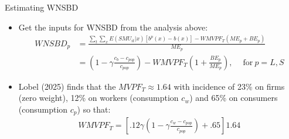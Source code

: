 \begin{frame}[label=payroll]{Estimating WNSBD}
    \begin{itemize}
        \item Get the inputs for WNSBD from the analysis above:
        {\footnotesize
        \begin{align*}
            WNSBD_p & = \frac{\sum_t\sum_xE(SMU_{it}|x)[b^p(x)-b(x)]-{WMVPF_T}(ME_p+BE_p)}{ME_p} \\
            & = \left(1-\gamma \frac{c_b - c_{pop}}{c_{pop}}\right) - {WMVPF_T}\left(1+\frac{BE_p}{ME_p}\right),\quad \ \text{for} \ p=L,S
        \end{align*}}


        \item Lobel (2025) finds that the ${MVPF_T}\approx 1.64$ with incidence of 23\% on firms (zero weight), 12\% on workers (consumption $c_w$) and 65\% on consumers (consumption $c_p$) so that:
        \begin{align*}
            {WMVPF_T} = \left[.12\gamma \left(1-\gamma \frac{c_w - c_{pop}}{c_{pop}}\right)+.65\right]1.64
        \end{align*}
    \end{itemize}
\end{frame}


